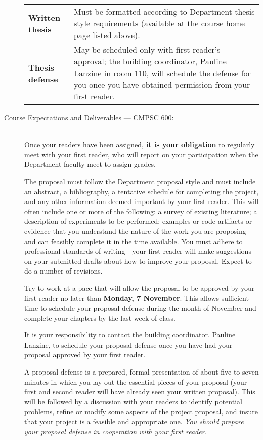 \begin{description}
\begin{center}
\begin{tabular}{lp{4in}}
\bf Written thesis & Must be
formatted according to Department thesis style requirements (available at the
course home page listed above).\\

\bf Thesis defense & May be scheduled only with first reader's approval;
the building coordinator, Pauline Lanzine in room 110, 
will schedule the defense for you once you have obtained
permission from your first reader.

\end{tabular}
\end{center}

\item[Course Expectations and Deliverables --- CMPSC 600:] \mbox{}\\

\medskip
{}
Once your readers have been assigned,
{\bf it is your obligation} to regularly meet with your first reader,
who will report on your participation when the Department faculty
meet to assign grades.

\medskip
{}
The proposal  must follow the Department proposal style and must include
an abstract, a bibliography, a tentative schedule for completing the
project, and any other information deemed important by your first
reader. This will often include one or more of the following:
a survey of existing literature;
a description of experiments to be performed;
examples or code artifacts or evidence that you understand the
nature of the work you are proposing and can feasibly complete it
in the time available. You must adhere to professional standards of
writing---your first reader will make suggestions on your submitted
drafts about how to improve your proposal.
Expect to do a number of revisions.

Try to work at a pace that will allow the proposal to be approved by your 
first reader no later than {\bf Monday, 7 November}. 
This allows sufficient time to schedule your proposal defense during
the month of November and complete your chapters by the last week of class.

\medskip
{}
It is your responsibility to contact the building coordinator, Pauline
Lanzine, to schedule your proposal defense
once you have had your proposal approved by your first reader.

A proposal defense is a prepared, formal presentation of about five to
seven minutes in which you lay out the essential pieces of your proposal
(your first and second reader will have already seen your written
proposal). This will be followed by a discussion with your readers to
identify potential problems, refine or modify some aspects of the
project proposal, and insure that your project is a feasible and
appropriate one. {\em You should prepare your proposal defense in
cooperation with your first reader.}


\end{description}
